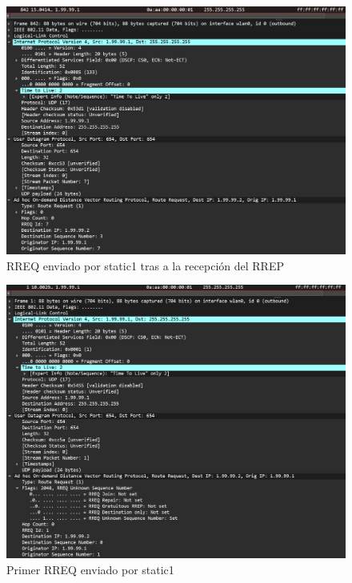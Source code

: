 \begin{figure}[H]
    \centering
    \includegraphics[width=125mm, scale=0.75]{imaxes/aodv/ejercicio8_1.png}
    \caption{RREQ enviado por static1 tras a la recepción del RREP}
    \label{fig:RREQstatic1}
\end{figure}

\begin{figure}[H]
    \centering
    \includegraphics[width=125mm, scale=0.75]{imaxes/aodv/ejercicio8_2.png}
    \caption{Primer RREQ enviado por static1}
    \label{fig:PrimerRREQstatic1}
\end{figure}

